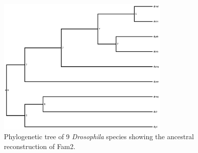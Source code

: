 \documentclass[10pt]{report}
\begin{document}
\begin{figure}
\centering
\includegraphics[width=0.75\textwidth]{results_tree.pdf}
\caption{Phylogenetic tree of 9 {\it Drosophila} species showing the ancestral reconstruction of Fam2.}
\label{fig:results_tree}
\end{figure}



\end{document}
